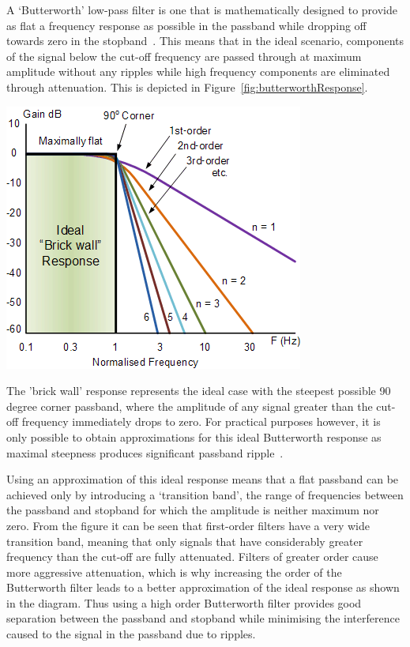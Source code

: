 \documentclass[main.tex]{subfiles}
\begin{document}
A `Butterworth' low-pass filter is one that is mathematically designed to provide as flat a frequency response as possible in the passband while dropping off towards zero in the stopband~\cite[p.17]{bianchi2007electronic}. This means that in the ideal scenario, components of the signal below the cut-off frequency are passed through at maximum amplitude without any ripples while high frequency components are eliminated through attenuation. This is depicted in Figure~\ref{fig:butterworthResponse}.   

\begin{center}
\includegraphics[scale=0.9]{images/butterworthResponse.png}
\label{fig:butterworthResponse}
\end{center}
The 'brick wall' response represents the ideal case with the steepest possible 90 degree corner passband, where the amplitude of any signal greater than the cut-off frequency immediately drops to zero. For practical purposes however, it is only possible to obtain approximations for this ideal Butterworth response as maximal steepness produces significant passband ripple~\cite{butterworthResponse}. 

Using an approximation of this ideal response means that a flat passband can be achieved only by introducing a `transition band', the range of frequencies between the passband and stopband for which the amplitude is neither maximum nor zero. From the figure it can be seen that first-order filters have a very wide transition band, meaning that only signals that have considerably greater frequency than the cut-off are fully attenuated. Filters of greater order cause more aggressive attenuation, which is why increasing the order of the Butterworth filter leads to a better approximation of the ideal response as shown in the diagram. Thus using a high order Butterworth filter provides good separation between the passband and stopband while minimising the interference caused to the signal in the passband due to ripples.    
\end{document}
